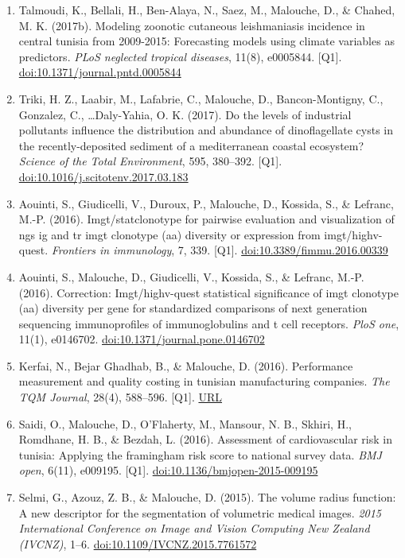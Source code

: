 \documentclass[11pt,a4paper,sans]{moderncv}
\begin{document}
\begin{enumerate}
\item Talmoudi, K., Bellali, H., Ben-Alaya, N., Saez, M., Malouche, D., \& Chahed, M. K. (2017b). Modeling zoonotic cutaneous leishmaniasis incidence in central tunisia from 2009-2015: Forecasting models using climate variables as predictors. \textit{PLoS neglected tropical diseases}, 11(8), e0005844. [Q1]. \href{https://doi.org/10.1371/journal.pntd.0005844}{doi:10.1371/journal.pntd.0005844}
\item Triki, H. Z., Laabir, M., Lafabrie, C., Malouche, D., Bancon-Montigny, C., Gonzalez, C., \ldots Daly-Yahia, O. K. (2017). Do the levels of industrial pollutants influence the distribution and abundance of dinoflagellate cysts in the recently-deposited sediment of a mediterranean coastal ecosystem? \textit{Science of the Total Environment}, 595, 380–392. [Q1]. \href{https://doi.org/10.1016/j.scitotenv.2017.03.183}{doi:10.1016/j.scitotenv.2017.03.183}
\item Aouinti, S., Giudicelli, V., Duroux, P., Malouche, D., Kossida, S., \& Lefranc, M.-P. (2016). Imgt/statclonotype for pairwise evaluation and visualization of ngs ig and tr imgt clonotype (aa) diversity or expression from imgt/highv-quest. \textit{Frontiers in immunology}, 7, 339. [Q1]. \href{https://doi.org/10.3389/fimmu.2016.00339}{doi:10.3389/fimmu.2016.00339}
\item Aouinti, S., Malouche, D., Giudicelli, V., Kossida, S., \& Lefranc, M.-P. (2016). Correction: Imgt/highv-quest statistical significance of imgt clonotype (aa) diversity per gene for standardized comparisons of next generation sequencing immunoprofiles of immunoglobulins and t cell receptors. \textit{PloS one}, 11(1), e0146702. \href{https://doi.org/10.1371/journal.pone.0146702}{doi:10.1371/journal.pone.0146702}
\item Kerfai, N., Bejar Ghadhab, B., \& Malouche, D. (2016). Performance measurement and quality costing in tunisian manufacturing companies. \textit{The TQM Journal}, 28(4), 588–596. [Q1]. \href{https://www.emerald.com/insight/content/doi/10.1108/TQM-10-2013-0119/full/html}{URL}
\item Saidi, O., Malouche, D., O'Flaherty, M., Mansour, N. B., Skhiri, H., Romdhane, H. B., \& Bezdah, L. (2016). Assessment of cardiovascular risk in tunisia: Applying the framingham risk score to national survey data. \textit{BMJ open}, 6(11), e009195. [Q1]. \href{https://doi.org/10.1136/bmjopen-2015-009195}{doi:10.1136/bmjopen-2015-009195}
\item Selmi, G., Azouz, Z. B., \& Malouche, D. (2015). The volume radius function: A new descriptor for the segmentation of volumetric medical images. \textit{2015 International Conference on Image and Vision Computing New Zealand (IVCNZ)}, 1–6. \href{https://doi.org/10.1109/IVCNZ.2015.7761572}{doi:10.1109/IVCNZ.2015.7761572}

\end{enumerate}
\end{document}
